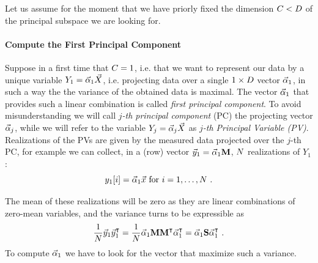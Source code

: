 Let us assume for the moment that we have priorly fixed the dimension $C<D$ of the principal subspace we are looking for. 

\paragraph*{Compute the First Principal Component}
Suppose in a first time that $C = 1$, i.e. that we want to represent our data by a unique variable $Y_1 =  \vec{\alpha}_1 \vec{X}{}$, i.e. projecting data over a single $ 1 \times D$ vector $\vec{\alpha}_1$, in such a way the the variance of the obtained data is maximal. The vector $\vec{\alpha}_1$ that provides such a linear combination is called {\em first principal component}. 
To avoid misunderstanding we will call {\em $j$-th principal component} (PC) the projecting vector $\vec{\alpha}_j$, while we will refer to the variable $Y_j = \vec{\alpha}_j \vec{X}{}$ as {\em $j$-th Principal Variable (PV)}. 
Realizations of the PVs are given by the measured data projected over the $j$-th PC, for example we can collect, in a (row) vector $\vec{y}_1 = \vec{\alpha}_1 \textbf{M} $, $N $ realizations of $Y_1$:
\begin{equation}
y_1[i] = \vec{\alpha}_1 \vec{x} \mbox{ for } i=1,\dots , N \mbox{ .}
\end{equation}

The mean of these realizations will be zero as they are linear combinations of zero-mean variables, and the variance turns to be expressible as
\begin{equation}
\frac{1}{N}\vec{y}_1\vec{y}_1^\intercal = \frac{1}{N}\vec{\alpha}_1\textbf{M}\textbf{M}^\intercal\vec{\alpha}_1^\intercal = \vec{\alpha}_1\textbf{S}\vec{\alpha}_1^\intercal \mbox{ .}
\end{equation}
To compute $\vec{\alpha}_1$ we have to look for the vector that maximize such a variance.\\

